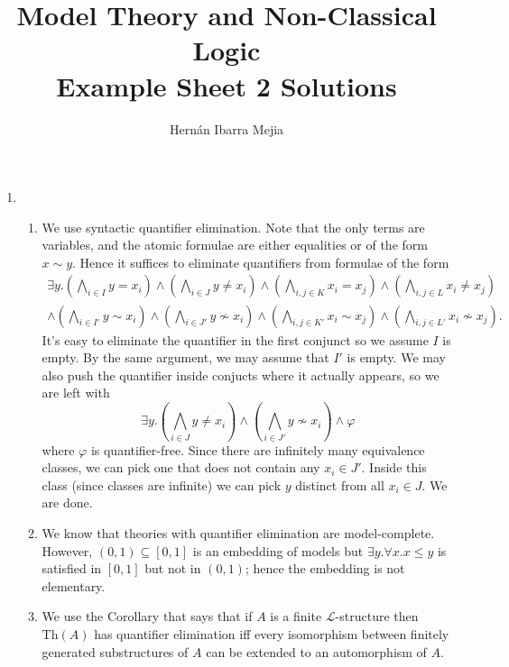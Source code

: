 \documentclass{article}
\theoremstyle{theorem}
\begin{document}
	\title{Model Theory and Non-Classical Logic\\ Example Sheet 2 Solutions}
	\author{Hernán Ibarra Mejia}
	\maketitle
	\begin{enumerate}[leftmargin=*]
		\item \begin{enumerate}
			\item We use syntactic quantifier elimination. Note that the only terms are variables, and the atomic formulae are either equalities or of the form $x\sim y$. Hence it suffices to eliminate quantifiers from formulae of the form
			\begin{multline*}
				\exists y. \left(\bigwedge_{i\in I}y = x_i\right)\wedge\left(\bigwedge_{i\in J}y \neq x_i\right)\wedge \left(\bigwedge_{i,j\in K}x_i = x_j\right)\wedge\left(\bigwedge_{i,j\in L}x_i \neq x_j\right)\\
				\wedge\left(\bigwedge_{i\in I'}y \sim x_i\right)\wedge\left(\bigwedge_{i\in J'}y \not\sim x_i\right)\wedge \left(\bigwedge_{i,j\in K'}x_i \sim x_j\right)\wedge\left(\bigwedge_{i,j\in L'}x_i \not\sim x_j\right).
			\end{multline*}
			It's easy to eliminate the quantifier in the first conjunct so we assume $I$ is empty. By the same argument, we may assume that $I'$ is empty. We may also push the quantifier inside conjucts where it actually appears, so we are left with
			\[
				\exists y.\left( \bigwedge_{i\in J} y \neq x_i \right) \wedge \left(\bigwedge_{i\in J'} y\not\sim x_i\right) \wedge \varphi
			\]
			where $\varphi$ is quantifier-free. Since there are infinitely many equivalence classes, we can pick one that does not contain any $x_i\in J'$. Inside this class (since classes are infinite) we can pick $y$ distinct from all $x_i\in J$. We are done.
		\item We know that theories with quantifier elimination are model-complete. However, $(0,1) \subseteq [0,1]$ is an embedding of models but $\exists y. \forall x. x \leq y$ is satisfied in $[0,1]$ but not in $(0,1)$; hence the embedding is not elementary.
		\item We use the Corollary that says that if $A$ is a finite $\mathcal{L}$-structure then $\text{Th}(A)$ has quantifier elimination iff every isomorphism between finitely generated substructures of $A$ can be extended to an automorphism of $A$. 
		

\end{enumerate}
\end{enumerate}
\end{document}
